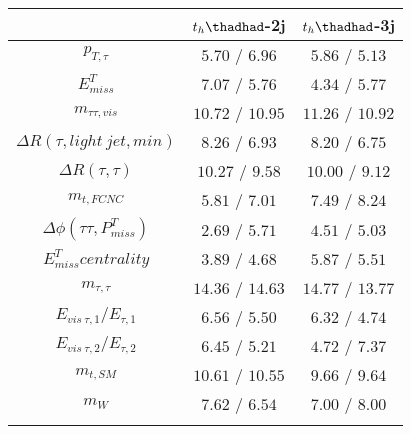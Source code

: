 \centering
\begin{tabular}{ccc} \toprule\toprule
  & $t_h\thadhad$-2j & $t_h\thadhad$-3j\\\midrule
$p_{T,\tau }$ & $5.70$ / $6.96$ & $5.86$ / $5.13$\\
$E^{T}_{miss}$ & $7.07$ / $5.76$ & $4.34$ / $5.77$\\
$m_{\tau \tau ,vis}$ & $10.72$ / $10.95$ & $11.26$ / $10.92$\\
$\Delta R(\tau ,light~jet,min)$ & $8.26$ / $6.93$ & $8.20$ / $6.75$\\
$\Delta R(\tau ,\tau )$ & $10.27$ / $9.58$ & $10.00$ / $9.12$\\
$m_{t,FCNC}$ & $5.81$ / $7.01$ & $7.49$ / $8.24$\\
$\Delta\phi(\tau \tau ,P^{T}_{miss})$ & $2.69$ / $5.71$ & $4.51$ / $5.03$\\
$E^{T}_{miss} centrality$ & $3.89$ / $4.68$ & $5.87$ / $5.51$\\
$m_{\tau ,\tau }$ & $14.36$ / $14.63$ & $14.77$ / $13.77$\\
$E_{vis~\tau ,1}/E_{\tau ,1}$ & $6.56$ / $5.50$ & $6.32$ / $4.74$\\
$E_{vis~\tau ,2}/E_{\tau ,2}$ & $6.45$ / $5.21$ & $4.72$ / $7.37$\\
$m_{t,SM}$ & $10.61$ / $10.55$ & $9.66$ / $9.64$\\
$m_{W}$ & $7.62$ / $6.54$ & $7.00$ / $8.00$\\
\bottomrule\bottomrule\\
\end{tabular}
